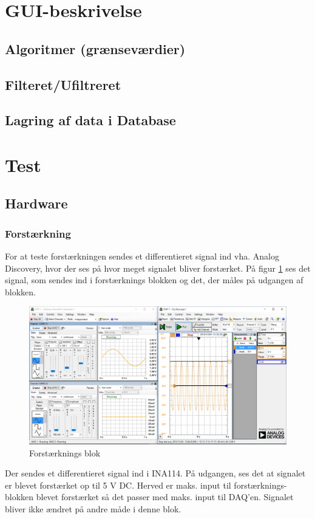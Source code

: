 \section{GUI-beskrivelse}
\subsection{Algoritmer (grænseværdier)}
\subsection{Filteret/Ufiltreret}
\subsection{Lagring af data i Database}

\section{Test}
\subsection{Hardware}
\subsubsection{Forstærkning}
For at teste forstærkningen sendes et differentieret signal ind vha. Analog Discovery, hvor der ses på hvor meget signalet bliver forstærket. 
På figur \ref{fig:forstaerkning} ses det signal, som sendes ind i forstærknings blokken og det, der måles på udgangen af blokken. 
\begin{figure}[H]
	\centering
	\includegraphics[width=1.0\textwidth]{Figurer/forst_blok}
	\caption{Forstærknings blok}
	\label{fig:forstaerkning}
\end{figure}
Der sendes et differentieret signal ind i INA114. På udgangen, ses det at signalet er blevet forstærket op til 5 V DC. Herved er maks. input til forstærknings-blokken blevet forstærket så det passer med maks. input til DAQ'en. Signalet bliver ikke ændret på andre måde i denne blok.

